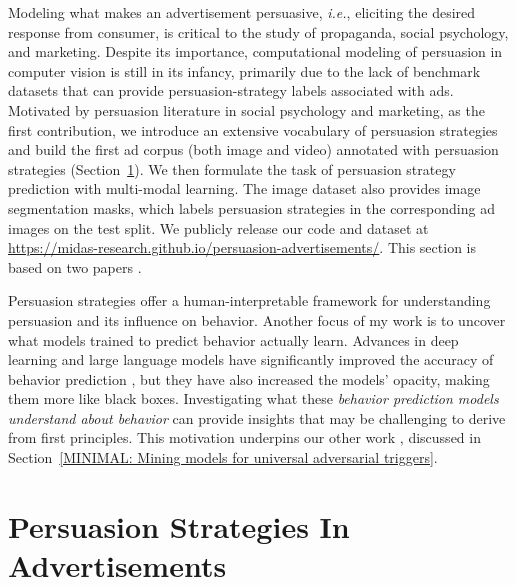 Modeling what makes an advertisement persuasive, \textit{i.e.}, eliciting the desired response from consumer, is critical to the study of propaganda, social psychology, and marketing. Despite its importance, computational modeling of persuasion in computer vision is still in its infancy, primarily due to the lack of benchmark datasets that can provide persuasion-strategy labels associated with ads. Motivated by persuasion literature in social psychology and marketing, as the first contribution, we introduce an extensive vocabulary of persuasion strategies and build the first ad corpus (both image and video) annotated with persuasion strategies (Section~\ref{sec:chapter-2 Persuasion Strategies In Advertisements}). We then formulate the task of persuasion strategy prediction with multi-modal learning. The image dataset also provides image segmentation masks, which labels persuasion strategies in the corresponding ad images on the test split. We publicly release our code and dataset at \url{https://midas-research.github.io/persuasion-advertisements/}. This section is based on two papers \cite{kumar2023persuasion,bhattacharya2023video}.


Persuasion strategies offer a human-interpretable framework for understanding persuasion and its influence on behavior. Another focus of my work is to uncover what models trained to predict behavior actually learn. Advances in deep learning and large language models have significantly improved the accuracy of behavior prediction \cite{khandelwal2023large}, but they have also increased the models' opacity, making them more like black boxes. Investigating what these \textit{behavior prediction models understand about behavior} can provide insights that may be challenging to derive from first principles. This motivation underpins our other work \cite{singla2022minimal}, discussed in Section~\ref{MINIMAL: Mining models for universal adversarial triggers}.



\section{Persuasion Strategies In Advertisements}
\label{sec:chapter-2 Persuasion Strategies In Advertisements}


